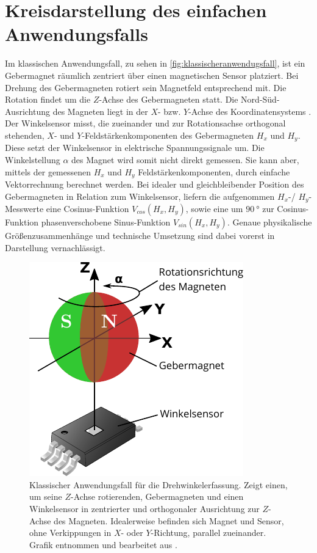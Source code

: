%

\section{Kreisdarstellung des einfachen Anwendungsfalls}\label{sec:kreisdarstellung-anwendug}


Im klassischen Anwendungsfall, zu sehen in \autoref{fig:klassischeranwendugsfall}, ist ein Gebermagnet räumlich 
zentriert über einen magnetischen Sensor platziert. Bei Drehung des Gebermagneten rotiert sein Magnetfeld entsprechend 
mit. Die Rotation findet um die $Z$-Achse des Gebermagneten statt. Die Nord-Süd-Ausrichtung des Magneten liegt in der 
$X$- bzw. $Y$-Achse des Koordinatensystems \cite{NXPSemiconductors2014}\cite{TDK2016}.
\newline
Der Winkelsensor misst, die zueinander und zur Rotationsachse orthogonal stehenden, $X$- und $Y$-Feldstärkenkomponenten 
des Gebermagneten $H_x$ und $H_y$. Diese setzt der Winkelsensor in elektrische Spannungssignale um. Die Winkelstellung 
$\alpha$ des Magnet wird somit nicht direkt gemessen. Sie kann aber, mittels der gemessenen $H_x$ und $H_y$ 
Feldstärkenkomponenten, durch einfache Vektorrechnung berechnet werden.
\newline
Bei idealer und gleichbleibender Position des Gebermagneten in Relation zum Winkelsensor, liefern die aufgenommen 
$H_x$-/ $H_y$-Messwerte eine Cosinus-Funktion $V_{cos}(H_x,H_y)$, sowie eine um $\SI{90}{\degree}$ zur Cosinus-Funktion 
phasenverschobene Sinus-Funktion $V_{sin}(H_x,H_y)$. Genaue physikalische Größenzusammenhänge und technische Umsetzung 
sind dabei vorerst in Darstellung vernachlässigt. 


\clearpage


\begin{figure}[tph]
	\centering
	\includegraphics[width=0.35\linewidth]{chapters/images/2-Grundlagen/Klassischer_Anwendugsfall}
	\caption[Klassischer Anwendungsfall für die Drehwinkelerfassung]{Klassischer Anwendungsfall für die 
		Drehwinkelerfassung. Zeigt einen, um seine $Z$-Achse rotierenden, Gebermagneten und einen Winkelsensor in 
		zentrierter und orthogonaler Ausrichtung zur $Z$-Achse des Magneten. Idealerweise befinden sich Magnet und 
		Sensor, 
		ohne Verkippungen in $X$- oder $Y$-Richtung, parallel zueinander. Grafik entnommen und bearbeitet aus 
		\cite{Schuethe2020a}.}
	\label{fig:klassischeranwendugsfall}
\end{figure}


